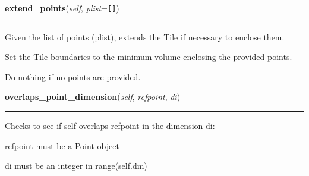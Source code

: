     \label{Tiling:Tile:extend_points}

    \vspace{0.5ex}

\hspace{.8\funcindent}\begin{boxedminipage}{\funcwidth}

    \raggedright \textbf{extend\_points}(\textit{self}, \textit{plist}={\tt []})

    \vspace{-1.5ex}

    \rule{\textwidth}{0.5\fboxrule}
\setlength{\parskip}{2ex}
    Given the list of points (plist), extends the Tile if necessary to 
    enclose them.

    Set the Tile boundaries to the minimum volume enclosing the provided 
    points.

    Do nothing if no points are provided.

\setlength{\parskip}{1ex}
    \end{boxedminipage}

    \label{Tiling:Tile:overlaps_point_dimension}

    \vspace{0.5ex}

\hspace{.8\funcindent}\begin{boxedminipage}{\funcwidth}

    \raggedright \textbf{overlaps\_point\_dimension}(\textit{self}, \textit{refpoint}, \textit{di})

    \vspace{-1.5ex}

    \rule{\textwidth}{0.5\fboxrule}
\setlength{\parskip}{2ex}
    Checks to see if self overlaps refpoint in the dimension di:

    refpoint must be a Point object

    di must be an integer in range(self.dm)

\setlength{\parskip}{1ex}
    \end{boxedminipage}

    \label{Tiling:Tile:get_point_occlusions}

